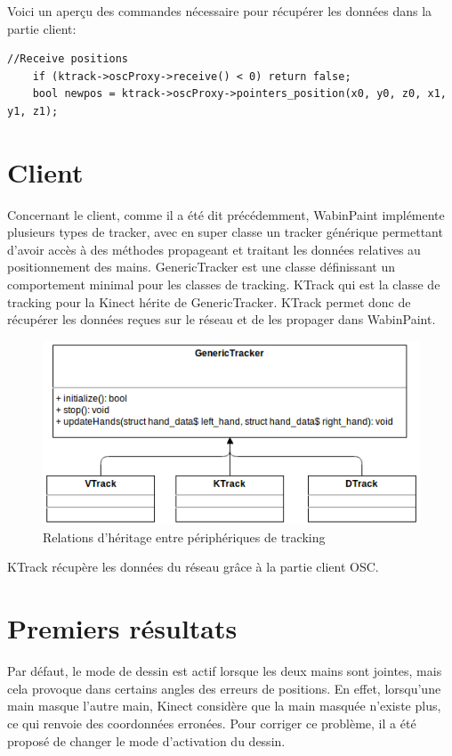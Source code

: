 Voici un aperçu des commandes nécessaire pour récupérer les données dans la partie client: 

\begin{lstlisting}
//Receive positions
	if (ktrack->oscProxy->receive() < 0) return false;
	bool newpos = ktrack->oscProxy->pointers_position(x0, y0, z0, x1, y1, z1);
\end{lstlisting}
	
\section{Client}

Concernant le client, comme il a été dit précédemment, WabinPaint implémente plusieurs types de tracker, avec en super classe un tracker générique permettant d'avoir accès à des méthodes propageant et traitant les données relatives au positionnement des mains. GenericTracker est une classe définissant un comportement minimal pour les classes de tracking. KTrack qui est la classe de tracking pour la Kinect hérite de GenericTracker. KTrack  permet donc de récupérer les données reçues sur le réseau et de les propager dans WabinPaint. 


\begin{figure}[!ht]
	\center
	\includegraphics[scale=0.5]{image/ktrack_implement.png}
	\caption{Relations d'héritage entre périphériques de tracking}
\end{figure}

KTrack récupère les données du réseau grâce à la partie client OSC.

\section{Premiers résultats}

Par défaut, le mode de dessin est actif lorsque les deux mains sont jointes, mais cela provoque dans certains angles des erreurs de positions. En effet, lorsqu'une main masque l'autre main, Kinect considère que la main masquée n'existe plus, ce qui renvoie des coordonnées erronées. Pour corriger ce problème, il a été proposé de changer le mode d'activation du dessin.

